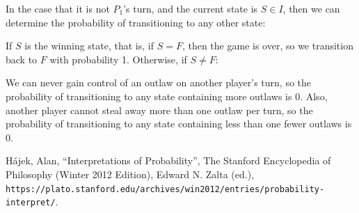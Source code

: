 \documentclass{article}
\theoremstyle{definition}
\theoremstyle{plain}
\begin{document}
	In the case that it is not $P_1$'s turn, and the current state is $S \in I$, then we can determine the probability of transitioning to any other state:

	If $S$ is the winning state, that is, if $S = F$, then the game is over, so we transition back to $F$ with probability 1. Otherwise, if $S \neq F$:

	We can never gain control of an outlaw on another player's turn, so the probability of transitioning to any state containing more outlaws is 0. Also, another player cannot steal away more than one outlaw per turn, so the probability of transitioning to any state containing less than one fewer outlaws is 0.
	
	
	
	\begin{thebibliography}{9}
		H\'{a}jek, Alan, ``Interpretations of Probability'', The Stanford Encyclopedia of Philosophy (Winter 2012 Edition), Edward N. Zalta (ed.), \texttt{https://plato.stanford.edu/archives/win2012/entries/probability-interpret/}.
	\end{thebibliography}
\end{document}
